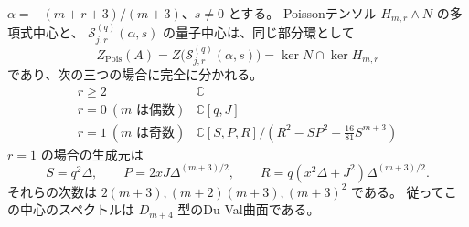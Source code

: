 \begin{theorem}
\label{thm:affine-polynomial-center-v34}
$\alpha=-(m+r+3)/(m+3)$、$s\ne0$ とする。
Poissonテンソル $H_{m,r}\wedge N$ の多項式中心と、
$\mathcal S_{j,r}^{(q)}(\alpha,s)$ の量子中心は、同じ部分環として
\[
 Z_{\mathrm{Pois}}(A)=Z\bigl(\mathcal S_{j,r}^{(q)}(\alpha,s)\bigr)
 =\ker N\cap\ker H_{m,r}
\]
であり、次の三つの場合に完全に分かれる。
\[
 \boxed{
 \begin{array}{c|c}
 r\ge2&\mathbb C\\[2pt]
 r=0\ (m\text{ は偶数})&\mathbb C[q,J]\\[2pt]
 r=1\ (m\text{ は奇数})&
 \mathbb C[S,P,R]/(R^2-SP^2-\tfrac{16}{81}S^{m+3})
 \end{array}
 }
\]
$r=1$ の場合の生成元は
\begin{equation}
 S=q^2\Delta,\qquad
 P=2xJ\Delta^{(m+3)/2},\qquad
 R=q(x^2\Delta+J^2)\Delta^{(m+3)/2}.
 \label{eq:ADE-central-generators-v34}
\end{equation}
それらの次数は $2(m+3),(m+2)(m+3),(m+3)^2$ である。
従ってこの中心のスペクトルは $D_{m+4}$ 型のDu Val曲面である。
\end{theorem}

